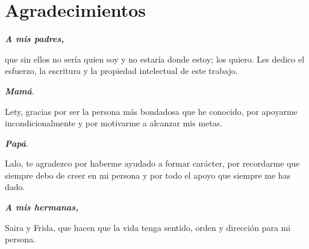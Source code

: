 


\chapter*{Agradecimientos}
\thispagestyle{agrad}

\textit{\textbf{\large{A mis padres,}}}

que sin ellos no sería quien soy y no estaría donde estoy; los quiero. Les dedico el esfuerzo, la escritura y la propiedad intelectual de este trabajo.

\textit{\textbf{Mamá}}. 

Lety, gracias por ser la persona más bondadosa que he conocido, por apoyarme incondicionalmente y por motivarme a alcanzar mis metas.

\textit{\textbf{Papá}}. 

Lalo, te agradezco por haberme ayudado a formar carácter, por recordarme que siempre debo de creer en mi persona y por todo el apoyo que siempre me has dado.


\textit{\textbf{\large{A mis hermanas,}}}

Saira y Frida, que hacen que la vida tenga sentido, orden y dirección para mi persona.


